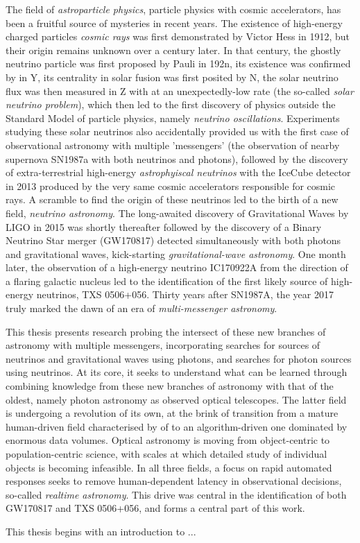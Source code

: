 The field of \emph{astroparticle physics}, particle physics with cosmic accelerators, has been a fruitful source of mysteries in recent years. The existence of high-energy charged particles \emph{cosmic rays} was first demonstrated by Victor Hess in 1912, but their origin remains unknown over a century later. In that century, the ghostly neutrino particle was first proposed by Pauli in 192n, its existence was confirmed by in Y, its centrality in solar fusion was first posited by N, the solar neutrino flux was then measured in Z with at an unexpectedly-low rate (the so-called \emph{solar neutrino problem}), which then led to the first discovery of physics outside the Standard Model of particle physics, namely \emph{neutrino oscillations}. Experiments studying these solar neutrinos also accidentally provided us with the first case of observational astronomy with multiple 'messengers' (the observation of nearby supernova SN1987a with both neutrinos and photons), followed by the discovery of extra-terrestrial high-energy \emph{astrophyiscal neutrinos} with the IceCube detector in 2013 produced by the very same cosmic accelerators responsible for cosmic rays. A scramble to find the origin of these neutrinos led to the birth of a new field, \emph{neutrino astronomy}. The long-awaited discovery of Gravitational Waves by LIGO in 2015 was shortly thereafter followed by the discovery of a Binary Neutrino Star merger (GW170817) detected simultaneously with both photons and gravitational waves, kick-starting \emph{gravitational-wave astronomy}. One month later, the observation of a high-energy neutrino IC170922A from the direction of a flaring galactic nucleus led to the identification of the first likely source of high-energy neutrinos, TXS 0506+056. Thirty years after SN1987A, the year 2017 truly marked the dawn of an era of \emph{multi-messenger astronomy}. 

This thesis presents research probing the intersect of these new branches of astronomy with multiple messengers, incorporating searches for sources of neutrinos and gravitational waves using photons, and searches for photon sources using neutrinos. At its core, it seeks to understand what can be learned through combining knowledge from these new branches of astronomy with that of the oldest, namely photon astronomy as observed optical telescopes. The latter field is undergoing a revolution of its own, at the brink of transition from a mature human-driven field characterised by  of to an algorithm-driven one dominated by enormous data volumes. Optical astronomy is moving from object-centric to population-centric science, with scales at which detailed study of individual objects is becoming infeasible. In all three fields, a focus on rapid automated responses seeks to remove human-dependent latency in observational decisions, so-called \emph{realtime astronomy}. This drive was central in the identification of both GW170817 and TXS 0506+056, and forms a central part of this work.

This thesis begins with an introduction to ...



